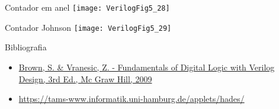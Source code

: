 \begin{frame}{Contador em anel}   \centering
    \texttt{[image: VerilogFig5\_28]} \\
\end{frame}

\begin{frame}{Contador Johnson}   \centering
    \texttt{[image: VerilogFig5\_29]} \\
\end{frame}



\begin{frame}{Bibliografia} 
	\begin{itemize}
		\item \href{https://www.google.com.br/search?q=filetype\%3Apdf+Fundamentals+of+Digital+Logic+with+Verilog+Design+&oq=filetype\%3Apdf}{Brown, S. \& Vranesic, Z. - Fundamentals of Digital Logic with Verilog Design, 3rd Ed., Mc Graw Hill, 2009}
		\item \href{https://tams-www.informatik.uni-hamburg.de/applets/hades/}{https://tams-www.informatik.uni-hamburg.de/applets/hades/}
	\end{itemize}
\end{frame}

\begin{frame}
	\titlepage
\end{frame} 


